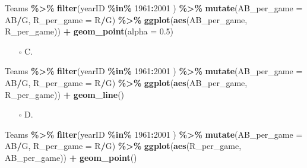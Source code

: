 \documentclass[
]{article}
\newenvironment{Shaded}{\begin{snugshade}}{\end{snugshade}}
\newcommand{\DataTypeTok}[1]{\textcolor[rgb]{0.13,0.29,0.53}{#1}}
\newcommand{\DecValTok}[1]{\textcolor[rgb]{0.00,0.00,0.81}{#1}}
\newcommand{\FloatTok}[1]{\textcolor[rgb]{0.00,0.00,0.81}{#1}}
\newcommand{\KeywordTok}[1]{\textcolor[rgb]{0.13,0.29,0.53}{\textbf{#1}}}
\newcommand{\NormalTok}[1]{#1}
\newcommand{\OperatorTok}[1]{\textcolor[rgb]{0.81,0.36,0.00}{\textbf{#1}}}
\newcommand{\StringTok}[1]{\textcolor[rgb]{0.31,0.60,0.02}{#1}}
\providecommand{\tightlist}{%
  \setlength{\itemsep}{0pt}\setlength{\parskip}{0pt}}
\begin{document}
\begin{Shaded}
\begin{Highlighting}[]
\NormalTok{Teams }\OperatorTok{\%\textgreater{}\%}\StringTok{ }\KeywordTok{filter}\NormalTok{(yearID }\OperatorTok{\%in\%}\StringTok{ }\DecValTok{1961}\OperatorTok{:}\DecValTok{2001}\NormalTok{ ) }\OperatorTok{\%\textgreater{}\%}
\StringTok{    }\KeywordTok{mutate}\NormalTok{(}\DataTypeTok{AB\_per\_game =}\NormalTok{ AB}\OperatorTok{/}\NormalTok{G, }\DataTypeTok{R\_per\_game =}\NormalTok{ R}\OperatorTok{/}\NormalTok{G) }\OperatorTok{\%\textgreater{}\%}
\StringTok{    }\KeywordTok{ggplot}\NormalTok{(}\KeywordTok{aes}\NormalTok{(AB\_per\_game, R\_per\_game)) }\OperatorTok{+}\StringTok{ }
\StringTok{    }\KeywordTok{geom\_point}\NormalTok{(}\DataTypeTok{alpha =} \FloatTok{0.5}\NormalTok{)}
\end{Highlighting}
\end{Shaded}

\begin{itemize}
\tightlist
\item[$\square$]
  C.
\end{itemize}

\begin{Shaded}
\begin{Highlighting}[]
\NormalTok{Teams }\OperatorTok{\%\textgreater{}\%}\StringTok{ }\KeywordTok{filter}\NormalTok{(yearID }\OperatorTok{\%in\%}\StringTok{ }\DecValTok{1961}\OperatorTok{:}\DecValTok{2001}\NormalTok{ ) }\OperatorTok{\%\textgreater{}\%}
\StringTok{    }\KeywordTok{mutate}\NormalTok{(}\DataTypeTok{AB\_per\_game =}\NormalTok{ AB}\OperatorTok{/}\NormalTok{G, }\DataTypeTok{R\_per\_game =}\NormalTok{ R}\OperatorTok{/}\NormalTok{G) }\OperatorTok{\%\textgreater{}\%}
\StringTok{    }\KeywordTok{ggplot}\NormalTok{(}\KeywordTok{aes}\NormalTok{(AB\_per\_game, R\_per\_game)) }\OperatorTok{+}\StringTok{ }
\StringTok{    }\KeywordTok{geom\_line}\NormalTok{()}
\end{Highlighting}
\end{Shaded}

\begin{itemize}
\tightlist
\item[$\square$]
  D.
\end{itemize}

\begin{Shaded}
\begin{Highlighting}[]
\NormalTok{Teams }\OperatorTok{\%\textgreater{}\%}\StringTok{ }\KeywordTok{filter}\NormalTok{(yearID }\OperatorTok{\%in\%}\StringTok{ }\DecValTok{1961}\OperatorTok{:}\DecValTok{2001}\NormalTok{ ) }\OperatorTok{\%\textgreater{}\%}
\StringTok{    }\KeywordTok{mutate}\NormalTok{(}\DataTypeTok{AB\_per\_game =}\NormalTok{ AB}\OperatorTok{/}\NormalTok{G, }\DataTypeTok{R\_per\_game =}\NormalTok{ R}\OperatorTok{/}\NormalTok{G) }\OperatorTok{\%\textgreater{}\%}
\StringTok{    }\KeywordTok{ggplot}\NormalTok{(}\KeywordTok{aes}\NormalTok{(R\_per\_game, AB\_per\_game)) }\OperatorTok{+}\StringTok{ }
\StringTok{    }\KeywordTok{geom\_point}\NormalTok{()}
\end{Highlighting}
\end{Shaded}
\end{document}
